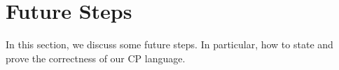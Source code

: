 \section{Future Steps}

In this section, we discuss some future steps. In particular, how to state and prove the correctness of our CP language.
